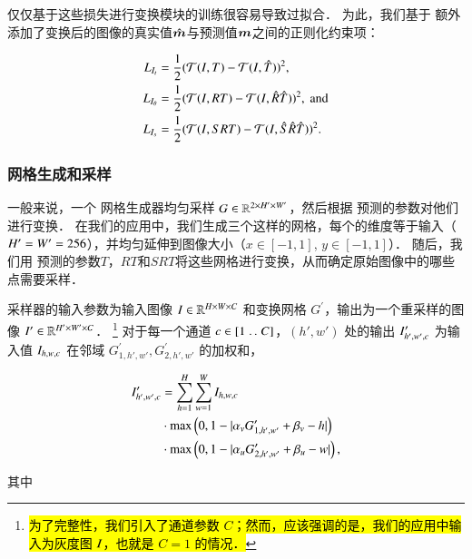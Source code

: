 仅仅基于这些损失进行变换模块的训练很容易导致过拟合．
为此，我们基于 \MSE{} 额外添加了变换后的图像的真实值$\hat{\bm{m}}$与预测值$\bm{m}$之间的正则化约束项：

\begin{align}
L_{I_t}      & = \frac{1}{2} (\mathcal{T}(I, T  ) - \mathcal{T}(I, \hat{T}  ))^2,                     \label{eqn:attn-image-loss-t} \\
L_{I_\theta} & = \frac{1}{2} (\mathcal{T}(I, RT ) - \mathcal{T}(I, \hat{R}\hat{T} ))^2, \mathrm{~and} \label{eqn:attn-image-loss-r} \\
L_{I_s}      & = \frac{1}{2} (\mathcal{T}(I, SRT) - \mathcal{T}(I, \hat{S}\hat{R}\hat{T}))^2.         \label{eqn:attn-image-loss-s}
\end{align}

\subsubsection{网格生成和采样}

一般来说，一个  网格生成器均匀采样 $G \in \mathbb{R}^{2 \times H' \times W'}$，然后根据 \LocNet{} 预测的参数对他们进行变换．
在我们的应用中，我们生成三个这样的网格，每个的维度等于输入（$H' = W' = 256$），并均匀延伸到图像大小（$x \in [-1,1]$, $y \in [-1, 1]$）．
随后，我们用 \LocNet{} 预测的参数$T$，$RT$和$SRT$将这些网格进行变换，从而确定原始图像中的哪些点需要采样．

采样器的输入参数为输入图像 $I \in \mathbb{R}^{H \times W \times C}$ 和变换网格 $G^\prime$，输出为一个重采样的图像 $I^\prime \in \mathbb{R}^{H' \times W' \times C}$．
\footnote{\hl{为了完整性，我们引入了通道参数 $C$；然而，应该强调的是，我们的应用中输入为灰度图 $I$，也就是 $C = 1$ 的情况．}}
对于每一个通道 $c \in [1 \mathrel{{.}\,{.}}\nobreak C ]$，$(h',w')$ 处的输出 $I^\prime_{h',w',c}$ 为输入值 $I_{h,w,c}$ 在邻域 $G^\prime_{1,h',w'}, G^\prime_{2,h',w'}$ 的加权和，

\begin{align*}
I^\prime_{h',w',c} & = \sum^H_{h=1}\sum^W_{w=1}I_{h, w, c} \\
                  & \cdot \max\left(0, 1-|\alpha_v G^\prime_{1, h', w'} + \beta_v - h| \right) \\
                  & \cdot \max\left(0, 1-|\alpha_u G^\prime_{2, h', w'} + \beta_u - w| \right),
\end{align*}

\noindent 其中

